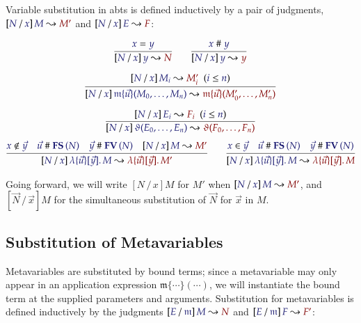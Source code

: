 \documentclass[11pt]{article}
\theoremstyle{definition}
\theoremstyle{remark}
\numberwithin{equation}{section}
\def\IModeColorName{MidnightBlue}
\def\OModeColorName{Maroon}
\newcommand\IMode[1]{{\color{\IModeColorName}{#1}}}
\newcommand\OMode[1]{{\color{\OModeColorName}{#1}}}
\newcommand\HypJ[2]{#1\ \ (#2)}
\newcommand\Member[2]{\IMode{#1}\in\IMode{#2}}
\newcommand\MkBTm[3]{\mathbb{\lambda}\{#1\}[#2].\, #3}
\newcommand\Leq[2]{\IMode{#1}\leq\IMode{#2}}
\newcommand\MV[1]{\mathfrak{#1}}
\newcommand\MApp[3]{#1\{#2\}(#3)}
\newcommand\App[2]{#1(#2)}
\newcommand\FV[1]{\mathbf{FV}\left(#1\right)}
\newcommand\FS[1]{\mathbf{FS}\left(#1\right)}
\newcommand\NotIn[2]{\IMode{#1}\notin\IMode{#2}}
\newcommand\Subst[3]{%
  \left[#1\, /\, #2\right]#3%
}
\newcommand\IsSubst[4]{%
  \Subst{\IMode{#1}}{\IMode{#2}}{\IMode{#3}}%
  \leadsto\OMode{#4}%
}
\newcommand\IsEq[2]{\IMode{#1} = \IMode{#2}}
\newcommand\IsApart[2]{\IMode{#1} \mathrel{\#} \IMode{#2}}
\begin{document}
Variable substitution in abts is defined inductively by a pair of judgments,
$\IsSubst{N}{x}{M}{M'}$ and $\IsSubst{N}{x}{E}{F}$:

\begin{gather*}
  \infer{
    \IsSubst{N}{x}{y}{N}
  }{
    \IsEq{x}{y}
  }
\qquad
  \infer{
    \IsSubst{N}{x}{y}{y}
  }{
    \IsApart{x}{y}
  }
\\[6pt]
  \infer{
    \IsSubst{N}{x}{
      \MApp{\MV{m}}{\vec{u}}{M_0,\dots,M_n}
    }{
      \MApp{\MV{m}}{\vec{u}}{M'_0,\dots,M'_n}
    }
  }{
    \HypJ{
      \IsSubst{N}{x}{M_i}{M'_i}
    }{
      \Leq{i}{n}
    }
  }
\\[6pt]
  \infer{
    \IsSubst{N}{x}{
      \App{\vartheta}{E_0,\dots,E_n}
    }{
      \App{\vartheta}{F_0,\dots,F_n}
    }
  }{
    \HypJ{
      \IsSubst{N}{x}{E_i}{F_i}
    }{
      \Leq{i}{n}
    }
  }
\end{gather*}
\begin{gather*}
  \infer{
    \IsSubst{N}{x}{
      \MkBTm{\vec{u}}{\vec{y}}{M}
    }{
      \MkBTm{\vec{u}}{\vec{y}}{M'}
    }
  }{
    \NotIn{x}{\vec{y}}
&
    \IsApart{\vec{u}}{\FS{N}}
&
    \IsApart{\vec{y}}{\FV{N}}
&
    \IsSubst{N}{x}{M}{M'}
  }
\qquad
  \infer{
    \IsSubst{N}{x}{
      \MkBTm{\vec{u}}{\vec{y}}{M}
    }{
      \MkBTm{\vec{u}}{\vec{y}}{M}
    }
  }{
    \Member{x}{\vec{y}}
&
    \IsApart{\vec{u}}{\FS{N}}
&
    \IsApart{\vec{y}}{\FV{N}}
  }
\end{gather*}

Going forward, we will write $\Subst{N}{x}{M}$ for $M'$ when
$\IsSubst{N}{x}{M}{M'}$, and $\Subst{\vec{N}}{\vec{x}}{M}$ for the simultaneous
substitution of $\vec{N}$ for $\vec{x}$ in $M$.

\subsection{Substitution of Metavariables}

Metavariables are substituted by bound terms; since a metavariable may only
appear in an application expression $\MApp{\MV{m}}{\cdots}{\cdots}$, we will
instantiate the bound term at the supplied parameters and arguments.
Substitution for metavariables is defined inductively by the judgments
$\IsSubst{E}{\MV{m}}{M}{N}$ and $\IsSubst{E}{\MV{m}}{F}{F'}$:
\end{document}
